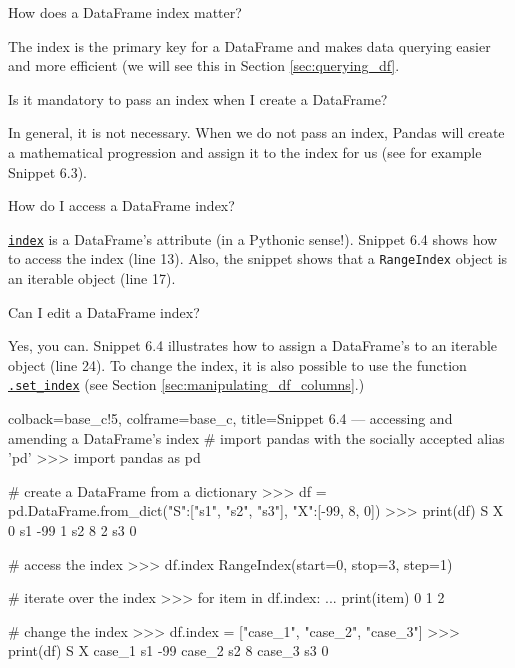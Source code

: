 \documentclass[a4paper,11pt]{book}
\numberwithin{figure}{chapter}
\numberwithin{table}{chapter}
\newcommand{\question}[1]{%
    \begin{tcolorbox}[colback=comp_c!10,colframe=comp_c,sidebyside align=top,width=\linewidth,before skip=1ex]
        #1
    \end{tcolorbox}
    \switchcolumn%
}
\newcommand{\note}[1]{%
    \begin{tcolorbox}[colback=white!0,colframe=white!10,width=\linewidth,before skip=1ex]
        #1
    \end{tcolorbox}
}
\begin{document}
\begin{paracol}{2}
	\question{\raggedright How does a DataFrame index matter?}
	\note{The index is the primary key for a DataFrame and makes data querying easier and more efficient (we will see this in Section \ref{sec:querying_df}.}
\end{paracol}

\begin{paracol}{2}
	\question{\raggedright Is it mandatory to pass an index when I create a DataFrame?}
	\note{In general, it is not necessary. When we do not pass an index, Pandas will create a mathematical progression and assign it to the index for us (see for example Snippet 6.3).}
\end{paracol}

\begin{paracol}{2}
	\question{\raggedright How do I access a DataFrame index?}
	\note{\href{https://pandas.pydata.org/docs/reference/api/pandas.DataFrame.index.html}{\texttt{index}} is a DataFrame's attribute (in a Pythonic sense!). Snippet 6.4 shows how to access the index (line 13). Also, the snippet shows that a \texttt{RangeIndex} object is an iterable object (line 17).}
\end{paracol}

\begin{paracol}{2}
	\question{\raggedright Can I edit a DataFrame index?}
	\note{Yes, you can. Snippet 6.4 illustrates how to assign a DataFrame's to an iterable object (line 24). To change the index, it is also possible to use the function \href{https://pandas.pydata.org/docs/reference/api/pandas.DataFrame.set_index.html}{\texttt{.set\_index}} (see Section \ref{sec:manipulating_df_columns}.)}
\end{paracol}

\begin{pythoncode}[linenos=True]{colback=base_c!5, colframe=base_c, title=\sffamily Snippet 6.4 --- accessing and amending a DataFrame's index}
# import pandas with the socially accepted alias 'pd'
>>> import pandas as pd

# create a DataFrame from a dictionary
>>> df = pd.DataFrame.from_dict({"S":["s1", "s2", "s3"], "X":[-99, 8, 0]})
>>> print(df)
    S   X
0  s1 -99
1  s2   8
2  s3   0

# access the index 
>>> df.index
RangeIndex(start=0, stop=3, step=1)

# iterate over the index
>>> for item in df.index:
...     print(item)
0
1
2

# change the index
>>> df.index = ["case_1", "case_2", "case_3"]
>>> print(df)
         S   X
case_1  s1 -99
case_2  s2   8
case_3  s3   0

\end{pythoncode}
\end{document}
